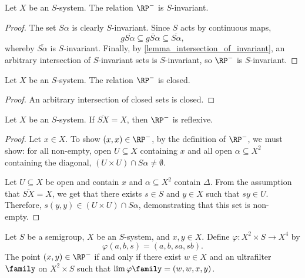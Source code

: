 \begin{lemma}
    \label{lemma_rp_basics_invariant}
    \leanok{}
    Let $X$ be an $S$-system.  The relation $\RP^-$ is $S$-invariant.
\end{lemma}

\begin{proof}
\leanok{}
    The set $S\alpha$ is clearly $S$-invariant.  Since $S$ acts by continuous maps,
        \[g \overline{S\alpha} \subseteq \overline{gS \alpha} \subseteq \overline{S \alpha},\]
    whereby $\overline{S\alpha}$ is $S$-invariant.  Finally, by \cref{lemma_intersection_of_invariant}, an arbitrary intersection of $S$-invariant sets is $S$-invariant, so $\RP^-$ is $S$-invariant.
\end{proof}

\begin{lemma}
\label{lemma_rp_basics_closed}
\leanok{}
    Let $X$ be an $S$-system.  The relation $\RP^-$ is closed.
\end{lemma}

\begin{proof}
\leanok{}
    An arbitrary intersection of closed sets is closed. 
\end{proof}

\begin{lemma}
\label{lemma_rp_reflexive}
\leanok{}
    Let $X$ be an $S$-system.  If $\overline{SX} = X$, then $\RP^-$ is reflexive.
\end{lemma}

\begin{proof}
\leanok{}
    Let $x \in X$.  To show $(x,x) \in \RP^-$, by the definition of $\RP^-$, we must show: for all non-empty, open $U \subseteq X$ containing $x$ and all open $\alpha \subseteq X^2$ containing the diagonal, $(U \times U) \cap S\alpha \neq \emptyset$.

    Let $U \subseteq X$ be open and contain $x$ and $\alpha \subseteq X^2$ contain $\Delta$.  From the assumption that $\overline{SX} = X$, we get that there exists $s \in S$ and $y \in X$ such that $sy \in U$.  Therefore, $s(y,y) \in (U \times U) \cap S \alpha$, demonstrating that this set is non-empty. 
\end{proof}

\begin{lemma}
\label{lemma_rp_implies_ultra}
\leanok{}
    Let $S$ be a semigroup, $X$ be an $S$-system, and $x, y \in X$. Define $\varphi: X^2 \times S \to X^4$ by
    \[\varphi (a, b, s) = (a, b, sa, sb).\]
    The point $(x,y) \in \RP^-$ if and only if there exist $w \in X$ and an ultrafilter $\family$ on $X^2 \times S$ such that $\lim \varphi \family = (w,w,x,y)$.
\end{lemma}

